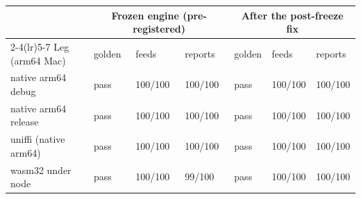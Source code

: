 \begin{tabular}{l lll lll}
\toprule
 & \multicolumn{3}{c}{Frozen engine (pre-registered)} & \multicolumn{3}{c}{After the post-freeze fix}\\
\cmidrule(lr){2-4}\cmidrule(lr){5-7}
Leg (arm64 Mac) & golden & feeds & reports & golden & feeds & reports\\
\midrule
native arm64 debug & pass & 100/100 & 100/100 & pass & 100/100 & 100/100 \\
native arm64 release & pass & 100/100 & 100/100 & pass & 100/100 & 100/100 \\
uniffi (native arm64) & pass & 100/100 & 100/100 & pass & 100/100 & 100/100 \\
wasm32 under node & pass & 100/100 & 99/100 & pass & 100/100 & 100/100 \\
\bottomrule
\end{tabular}

